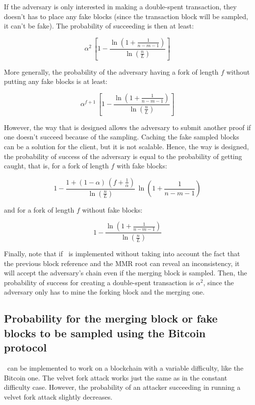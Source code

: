 \documentclass[11pt]{report}
\begin{document}
                If the adversary is only interested in making a double-spent transaction, they doesn't has to place any fake blocks (since the transaction block will be sampled, it can't be fake). The probability of succeeding is then at least:
                
                \[\alpha^2\,\left[1-\frac{\ln\left(1+\frac{1}{n-m-1}\right)}{\ln\left(\frac{n}{L}\right)}\right]\]
                
                More generally, the probability of the adversary having a fork of length \(f\) without putting any fake blocks is at least:
                
                \[\alpha^{f+1}\,\left[1-\frac{\ln\left(1+\frac{1}{n-m-1}\right)}{\ln\left(\frac{n}{L}\right)}\right]\]
                
                However, the way that \FC is designed allows the adversary to submit another proof if one doesn't succeed because of the sampling. Caching the fake sampled blocks can be a solution for the client, but it is not scalable. Hence, the way \FC is designed, the probability of success of the adversary is equal to the probability of getting caught, that is, for a fork of length \(f\) with fake blocks:
                
                \[1-\frac{1+(1-\alpha)\,\left(f+\frac1\alpha\right)}{\ln\left(\frac{n}{L}\right)}\,\ln\left(1+\frac{1}{n-m-1}\right)\]
                
                and for a fork of length \(f\) without fake blocks:
                
                \[1-\frac{\ln\left(1+\frac{1}{n-m-1}\right)}{\ln\left(\frac{n}{L}\right)}\]
                
                Finally, note that if \FC\ is implemented without taking into account the fact that the previous block reference and the MMR root can reveal an inconsistency, it will accept the adversary's chain even if the merging block is sampled. Then, the probability of success for creating a double-spent transaction is \(\alpha^2\), since the adversary only has to mine the forking block and the merging one.
            \subsection{Probability for the merging block or fake blocks to be sampled using the Bitcoin protocol}
                \FC\ can be implemented to work on a blockchain with a variable difficulty, like the Bitcoin one. The velvet fork attack works just the same as in the constant difficulty case. However, the probability of an attacker succeeding in running a velvet fork attack slightly decreases.
                
\end{document}
